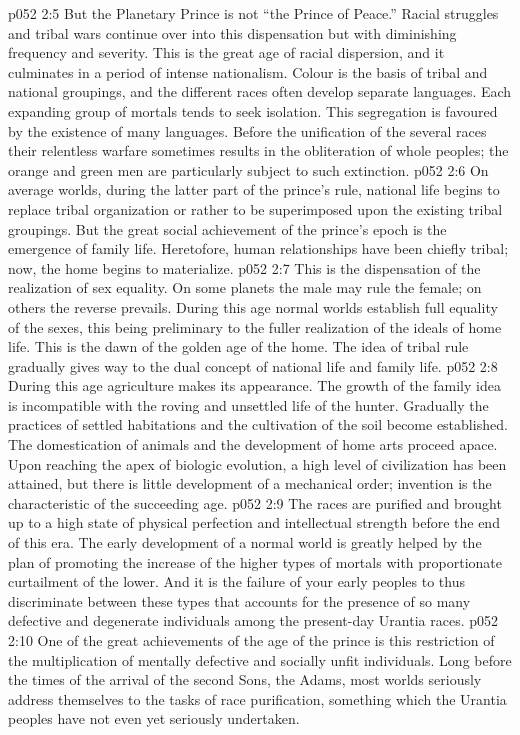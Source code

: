 \vs p052 2:5 \pc But the Planetary Prince is not “the Prince of Peace.” Racial struggles and tribal wars continue over into this dispensation but with diminishing frequency and severity. This is the great age of racial dispersion, and it culminates in a period of intense nationalism. Colour is the basis of tribal and national groupings, and the different races often develop separate languages. Each expanding group of mortals tends to seek isolation. This segregation is favoured by the existence of many languages. Before the unification of the several races their relentless warfare sometimes results in the obliteration of whole peoples; the orange and green men are particularly subject to such extinction.
\vs p052 2:6 On average worlds, during the latter part of the prince’s rule, national life begins to replace tribal organization or rather to be superimposed upon the existing tribal groupings. But the great social achievement of the prince’s epoch is the emergence of family life. Heretofore, human relationships have been chiefly tribal; now, the home begins to materialize.
\vs p052 2:7 This is the dispensation of the realization of sex equality. On some planets the male may rule the female; on others the reverse prevails. During this age normal worlds establish full equality of the sexes, this being preliminary to the fuller realization of the ideals of home life. This is the dawn of the golden age of the home. The idea of tribal rule gradually gives way to the dual concept of national life and family life.
\vs p052 2:8 During this age agriculture makes its appearance. The growth of the family idea is incompatible with the roving and unsettled life of the hunter. Gradually the practices of settled habitations and the cultivation of the soil become established. The domestication of animals and the development of home arts proceed apace. Upon reaching the apex of biologic evolution, a high level of civilization has been attained, but there is little development of a mechanical order; invention is the characteristic of the succeeding age.
\vs p052 2:9 \pc The races are purified and brought up to a high state of physical perfection and intellectual strength before the end of this era. The early development of a normal world is greatly helped by the plan of promoting the increase of the higher types of mortals with proportionate curtailment of the lower. And it is the failure of your early peoples to thus discriminate between these types that accounts for the presence of so many defective and degenerate individuals among the present\hyp{}day Urantia races.
\vs p052 2:10 One of the great achievements of the age of the prince is this restriction of the multiplication of mentally defective and socially unfit individuals. Long before the times of the arrival of the second Sons, the Adams, most worlds seriously address themselves to the tasks of race purification, something which the Urantia peoples have not even yet seriously undertaken.
